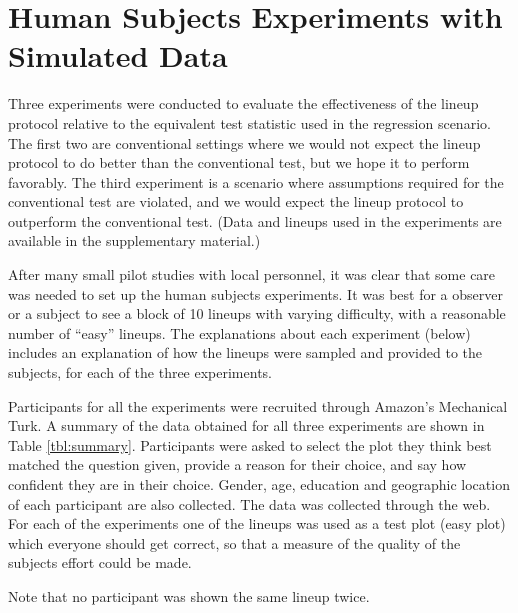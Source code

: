 \documentclass{article}
\newcommand{\blue}[1]{{\color{blue} #1}} %
\newcommand{\green}[1]{{\color{green} #1}} %
\begin{document}
\section{Human Subjects Experiments with Simulated Data} \label{sec:simulation}

Three experiments were conducted to evaluate the effectiveness of the lineup protocol relative to the equivalent test statistic used in the regression scenario. The first two are conventional settings where we would not expect the lineup protocol to do better than the conventional test, but we hope it to perform favorably. The third experiment is a scenario where assumptions required for the conventional test are violated, and we would expect the lineup protocol to outperform the conventional test. (Data and lineups used in the experiments are available in the supplementary material.)

After many small pilot studies with local personnel, it was clear that some care was needed to set up the human subjects experiments. It was best for a observer or a subject to see a block of 10 lineups with varying difficulty, with a reasonable number of ``easy'' lineups. The explanations about each experiment (below) includes an explanation of how the lineups were sampled and provided to the subjects, for each of the three experiments.

Participants for all the experiments were recruited through \cite{turk} Amazon's Mechanical Turk. A summary of the data obtained for all three experiments are shown in Table \ref{tbl:summary}. Participants were asked to select the plot they think best matched the question given, provide a reason for their choice, and say how confident they are in their choice. Gender, age, education and geographic location of each participant are also collected. The data was collected through the web. For each of the experiments one of the lineups was used as a test plot (easy plot) which everyone should get correct, so that a measure of the quality of the subjects effort could be made. 

Note that no participant was shown the same lineup twice.
\end{document}
